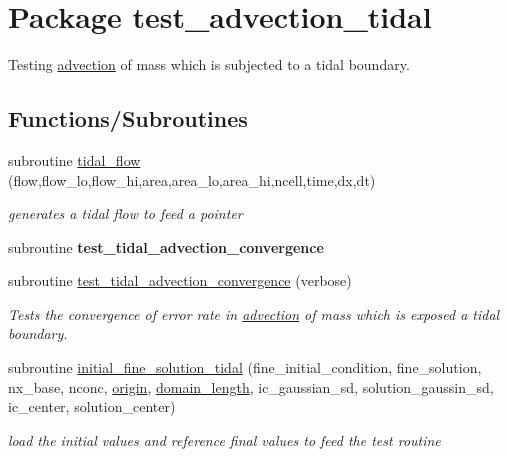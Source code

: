 \hypertarget{a00075}{
\section{Package test\_\-advection\_\-tidal}
\label{a00075}
}
Testing \hyperlink{a00052}{advection} of mass which is subjected to a tidal boundary.  


\subsection*{Functions/Subroutines}
\begin{CompactItemize}
\item 
subroutine \hyperlink{a00075_a641e8962260d8ad121308cc9b47f0ba}{tidal\_\-flow} (flow,flow\_\-lo,flow\_\-hi,area,area\_\-lo,area\_\-hi,ncell,time,dx,dt)
\begin{CompactList}\small\item\em generates a tidal flow to feed a pointer \item\end{CompactList}\item 
\hypertarget{a00075_a0d1b166fc5d9d02326552a191ff9680}{
subroutine \textbf{test\_\-tidal\_\-advection\_\-convergence}}
\label{a00075_a0d1b166fc5d9d02326552a191ff9680}

\item 
\hypertarget{a00075_cc0b84a83a06778691b434d900dbb346}{
subroutine \hyperlink{a00075_cc0b84a83a06778691b434d900dbb346}{test\_\-tidal\_\-advection\_\-convergence} (verbose)}
\label{a00075_cc0b84a83a06778691b434d900dbb346}

\begin{CompactList}\small\item\em Tests the convergence of error rate in \hyperlink{a00052}{advection} of mass which is exposed a tidal boundary. \item\end{CompactList}\item 
subroutine \hyperlink{a00075_274a3add96450377dc8a8b3a940b9b92}{initial\_\-fine\_\-solution\_\-tidal} (fine\_\-initial\_\-condition, fine\_\-solution, nx\_\-base, nconc, \hyperlink{a00075_ace3ff1fc926161c0767e4cf71ef4312}{origin}, \hyperlink{a00075_a6e296389f1fbf10fb55683356df7be1}{domain\_\-length}, ic\_\-gaussian\_\-sd, solution\_\-gaussin\_\-sd, ic\_\-center, solution\_\-center)
\begin{CompactList}\small\item\em load the initial values and reference final values to feed the test routine \item\end{CompactList}\end{CompactItemize}
